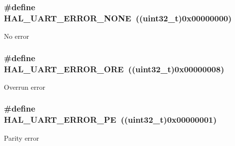 \subsubsection[{\texorpdfstring{H\+A\+L\+\_\+\+U\+A\+R\+T\+\_\+\+E\+R\+R\+O\+R\+\_\+\+N\+O\+NE}{HAL_UART_ERROR_NONE}}]{\setlength{\rightskip}{0pt plus 5cm}\#define H\+A\+L\+\_\+\+U\+A\+R\+T\+\_\+\+E\+R\+R\+O\+R\+\_\+\+N\+O\+NE~((uint32\+\_\+t)0x00000000)}\hypertarget{group___u_a_r_t___error___code_ga275de35cb518c19c284764f3ecb1aac5}{}\label{group___u_a_r_t___error___code_ga275de35cb518c19c284764f3ecb1aac5}
No error 
\subsubsection[{\texorpdfstring{H\+A\+L\+\_\+\+U\+A\+R\+T\+\_\+\+E\+R\+R\+O\+R\+\_\+\+O\+RE}{HAL_UART_ERROR_ORE}}]{\setlength{\rightskip}{0pt plus 5cm}\#define H\+A\+L\+\_\+\+U\+A\+R\+T\+\_\+\+E\+R\+R\+O\+R\+\_\+\+O\+RE~((uint32\+\_\+t)0x00000008)}\hypertarget{group___u_a_r_t___error___code_gaedc030add6c499cf41be7f12dd95930c}{}\label{group___u_a_r_t___error___code_gaedc030add6c499cf41be7f12dd95930c}
Overrun error 
\subsubsection[{\texorpdfstring{H\+A\+L\+\_\+\+U\+A\+R\+T\+\_\+\+E\+R\+R\+O\+R\+\_\+\+PE}{HAL_UART_ERROR_PE}}]{\setlength{\rightskip}{0pt plus 5cm}\#define H\+A\+L\+\_\+\+U\+A\+R\+T\+\_\+\+E\+R\+R\+O\+R\+\_\+\+PE~((uint32\+\_\+t)0x00000001)}\hypertarget{group___u_a_r_t___error___code_gad447a37701acd199dcb653ce32917970}{}\label{group___u_a_r_t___error___code_gad447a37701acd199dcb653ce32917970}
Parity error 